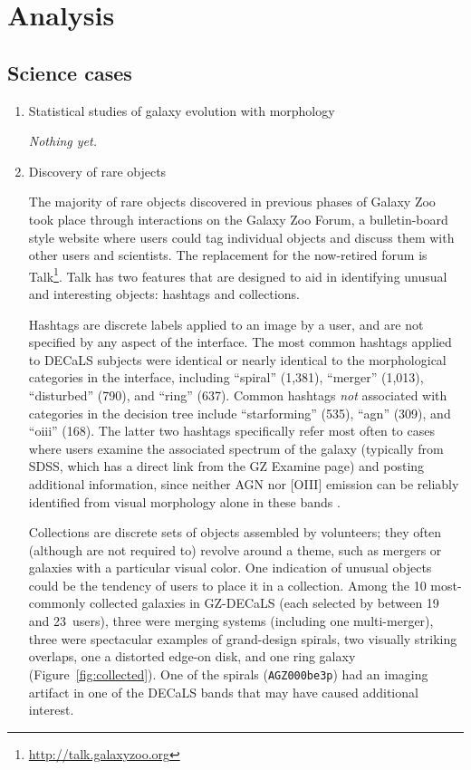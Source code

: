 \documentclass[iop,apj,tighten]{emulateapj}
\begin{document}
\section{Analysis}

\subsection{Science cases}

\begin{enumerate}

\item Statistical studies of galaxy evolution with morphology

\textit{Nothing yet.}

\item Discovery of rare objects

The majority of rare objects discovered in previous phases of Galaxy Zoo took place through interactions on the Galaxy Zoo Forum, a bulletin-board style website where users could tag individual objects and discuss them with other users and scientists. The replacement for the now-retired forum is Talk\footnote{\url{http://talk.galaxyzoo.org}}. Talk has two features that are designed to aid in identifying unusual and interesting objects: hashtags and collections. 

Hashtags are discrete labels applied to an image by a user, and are not specified by any aspect of the interface. The most common hashtags applied to DECaLS subjects were identical or nearly identical to the morphological categories in the interface, including ``spiral'' (1,381), ``merger'' (1,013), ``disturbed'' (790), and ``ring'' (637). Common hashtags \emph{not} associated with categories in the decision tree include ``starforming'' (535), ``agn'' (309), and ``oiii'' (168). The latter two hashtags specifically refer most often to cases where users examine the associated spectrum of the galaxy (typically from SDSS, which has a direct link from the GZ Examine page) and posting additional information, since neither AGN nor [OIII] emission can be reliably identified from visual morphology alone in these bands \citep[but see][for an example of emission-line galaxies using different bands]{car09}. 

Collections are discrete sets of objects assembled by volunteers; they often (although are not required to) revolve around a theme, such as mergers or galaxies with a particular visual color. One indication of unusual objects could be the tendency of users to place it in a collection. Among the 10 most-commonly collected galaxies in GZ-DECaLS (each selected by between 19 and 23~users), three were merging systems (including one multi-merger), three were spectacular examples of grand-design spirals, two visually striking overlaps, one a distorted edge-on disk, and one ring galaxy (Figure~\ref{fig:collected}). One of the spirals (\texttt{AGZ000be3p}) had an imaging artifact in one of the DECaLS bands that may have caused additional interest. 


\end{enumerate}
\end{document}
